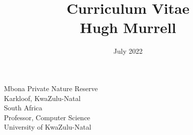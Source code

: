 \documentclass[12pt]{article}
\title{ Curriculum Vitae \\
           Hugh Murrell \\
        \vspace{0.5cm} }
\date{July 2022}
\begin{document}
\maketitle


\begin{figure}[ht]
\end{figure}
\begin{flushright}
\vspace{1.5cm}
Mbona Private Nature Reserve \\
Karkloof, KwaZulu-Natal \\
South Africa \\
\vspace{0.5cm}
Professor, Computer Science \\ 
University of KwaZulu-Natal \\

\end{flushright}

\newpage


\newpage

\newpage

\newpage

\newpage





\newpage

\newpage

\end{document}
